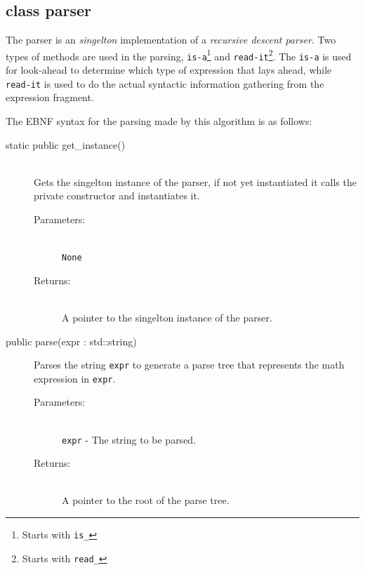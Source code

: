 \documentclass[a4paper,11pt]{kth-mag}
\begin{document}
\subsection{class parser}
The parser is an \emph{singelton} implementation of a \emph{recursive descent parser}. Two
types of methods are used in the parsing, \texttt{is-a}\footnote{Starts with
\texttt{is\_}} and \texttt{read-it}\footnote{Starts with \texttt{read\_}}.
The \texttt{is-a} is used for look-ahead to determine which type of expression
that lays ahead, while \texttt{read-it} is used to do the actual syntactic 
information gathering from the expression fragment.

The EBNF syntax for the parsing made by this algorithm is as follows:\\


\begin{description}
    \item[static public get\_instance()]~\\
    Gets the singelton instance of the parser, if not yet instantiated it calls
    the private constructor and instantiates it.
    \begin{description}
        \item[Parameters:]~\\
            \verb+None+
        \item[Returns:]~\\
            A pointer to the singelton instance of the parser.
    \end{description}
\end{description}

\begin{description}
    \item[public parse(expr : std::string)] Parses the string \texttt{expr} to
    generate a parse tree that represents the math expression in \texttt{expr}.
    \begin{description}
        \item[Parameters:]~\\
            \verb+expr+ - The string to be parsed.
        \item[Returns:]~\\
            A pointer to the root of the parse tree.
    \end{description}
\end{description}
\end{document}
